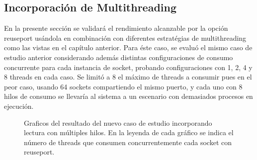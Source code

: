 \subsection{Incorporación de Multithreading}
En la presente sección se validará el rendimiento alcanzable por la opción reuseport usándola en combinación con diferentes estratégias de multithreading como las vistas en el capítulo anterior. Para éste caso, se evaluó el mismo caso de estudio anterior considerando además distintas configuraciones de consumo concurrente para cada instancia de socket, probando configuraciones con 1, 2, 4 y 8 threads en cada caso. Se limitó a 8 el máximo de threads a consumir pues en el peor caso, usando 64 sockets compartiendo el mismo puerto, y cada uno con 8 hilos de consumo se llevaría al sistema a un escenario con demasiados procesos en ejecución.

\begin{figure}[h!]
	\centering
	\hspace*{\fill}
	\hfill
	\caption{Graficos del resultado del nuevo caso de estudio incorporando lectura con múltiples hilos. En la leyenda de cada gráfico se indica el número de threads que consumen concurrentemente cada socket con reuseport.}
	\label{fig:resultadosReuseport2}
	\hspace*{\fill}
\end{figure}

